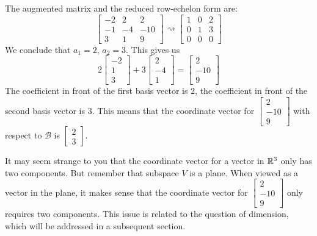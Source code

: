 \documentclass{ximera}
\begin{document}
\begin{example}
\begin{explanation}
 The augmented matrix and the reduced row-echelon form are:
 $$\left[\begin{array}{cc|c}  
 -2&2&2\\-1&-4&-10\\3&1&9
 \end{array}\right]\rightsquigarrow\left[\begin{array}{cc|c}  
 1&0&2\\0&1&3\\0&0&0
 \end{array}\right]$$
 We conclude that $a_1=2$, $a_2=3$.  This gives us
 $$2\begin{bmatrix}-2\\1\\3\end{bmatrix}+3\begin{bmatrix}2\\-4\\1\end{bmatrix}=\begin{bmatrix}2\\-10\\9\end{bmatrix}$$
 The coefficient in front of the first basis vector is $2$, the coefficient in front of the second basis vector is $3$.  This means that the coordinate vector for $\begin{bmatrix}2\\-10\\9\end{bmatrix}$ with respect to $\mathcal{B}$ is $\begin{bmatrix}2\\3\end{bmatrix}$.
 
 It may seem strange to you that the coordinate vector for a vector in $\mathbb{R}^3$ only has two components.  But remember that subspace $V$ is a plane.  When viewed as a vector in the plane, it  makes sense that the coordinate vector for $\begin{bmatrix}2\\-10\\9\end{bmatrix}$ only requires two components.  This issue is related to the question of dimension, which will be addressed in a subsequent section.
\end{explanation}
\end{example}
\end{document}
